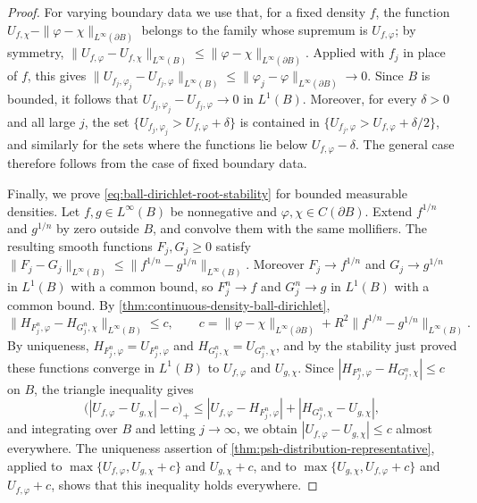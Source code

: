 \begin{proof}
For varying boundary data we use that, for a fixed density $f$, the function $U_{f,\chi}-\|\varphi-\chi\|_{L^\infty(\partial B)}$ belongs to the family whose supremum is $U_{f,\varphi}$; by symmetry, $\|U_{f,\varphi}-U_{f,\chi}\|_{L^\infty(B)}\le\|\varphi-\chi\|_{L^\infty(\partial B)}$. Applied with $f_j$ in place of $f$, this gives $\|U_{f_j,\varphi_j}-U_{f_j,\varphi}\|_{L^\infty(B)}\le\|\varphi_j-\varphi\|_{L^\infty(\partial B)}\to0$. Since $B$ is bounded, it follows that $U_{f_j,\varphi_j}-U_{f_j,\varphi}\to0$ in $L^1(B)$. Moreover, for every $\delta>0$ and all large $j$, the set $\{U_{f_j,\varphi_j}>U_{f,\varphi}+\delta\}$ is contained in $\{U_{f_j,\varphi}>U_{f,\varphi}+\delta/2\}$, and similarly for the sets where the functions lie below $U_{f,\varphi}-\delta$. The general case therefore follows from the case of fixed boundary data.

Finally, we prove \eqref{eq:ball-dirichlet-root-stability} for bounded measurable densities. Let $f,g\in L^\infty(B)$ be nonnegative and $\varphi,\chi\in C(\partial B)$. Extend $f^{1/n}$ and $g^{1/n}$ by zero outside $B$, and convolve them with the same mollifiers. The resulting smooth functions $F_j,G_j\ge0$ satisfy $\|F_j-G_j\|_{L^\infty(B)}\le\|f^{1/n}-g^{1/n}\|_{L^\infty(B)}$. Moreover $F_j\to f^{1/n}$ and $G_j\to g^{1/n}$ in $L^1(B)$ with a common bound, so $F_j^n\to f$ and $G_j^n\to g$ in $L^1(B)$ with a common bound. By \cref{thm:continuous-density-ball-dirichlet},
\[
 \|H_{F_j^n,\varphi}-H_{G_j^n,\chi}\|_{L^\infty(B)}\le c,
 \qquad c=\|\varphi-\chi\|_{L^\infty(\partial B)}+R^2\|f^{1/n}-g^{1/n}\|_{L^\infty(B)}.
\]
By uniqueness, $H_{F_j^n,\varphi}=U_{F_j^n,\varphi}$ and $H_{G_j^n,\chi}=U_{G_j^n,\chi}$, and by the stability just proved these functions converge in $L^1(B)$ to $U_{f,\varphi}$ and $U_{g,\chi}$. Since $|H_{F_j^n,\varphi}-H_{G_j^n,\chi}|\le c$ on $B$, the triangle inequality gives
\[
 \bigl(|U_{f,\varphi}-U_{g,\chi}|-c\bigr)_+\le|U_{f,\varphi}-H_{F_j^n,\varphi}|+|H_{G_j^n,\chi}-U_{g,\chi}|,
\]
and integrating over $B$ and letting $j\to\infty$, we obtain $|U_{f,\varphi}-U_{g,\chi}|\le c$ almost everywhere. The uniqueness assertion of \cref{thm:psh-distribution-representative}, applied to $\max\{U_{f,\varphi},U_{g,\chi}+c\}$ and $U_{g,\chi}+c$, and to $\max\{U_{g,\chi},U_{f,\varphi}+c\}$ and $U_{f,\varphi}+c$, shows that this inequality holds everywhere.
\end{proof}
